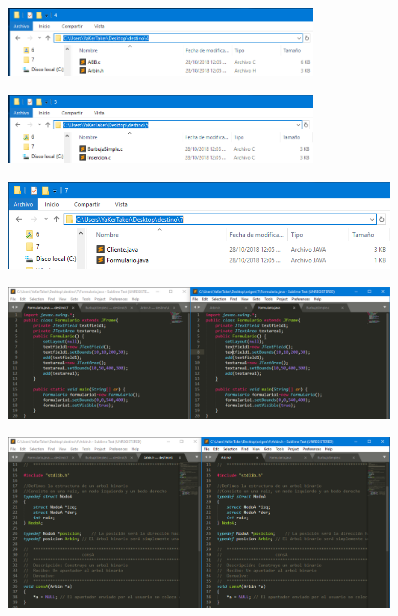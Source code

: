 \documentclass[12pt]{article}
\begin{document}
\begin{itemize}
			         \begin{figure}[h!]
			          \centering \includegraphics[width=0.72\textwidth]{Practica5/Images/windows/7_8.png}
			         \end{figure}
			         
			          \begin{figure}[h!]
			          \centering \includegraphics[width=0.72\textwidth]{Practica5/Images/windows/7_9.png}
			         \end{figure}
			         
			         \begin{figure}[h!]
			          \centering \includegraphics[width=0.9\textwidth]{Practica5/Images/windows/7_10.png}
			         \end{figure}
			         
			          \begin{figure}[h!]
			          \centering \includegraphics[width=0.9\textwidth]{Practica5/Images/windows/7_11.PNG}
			         \end{figure}
			         
			         \begin{figure}[h!]
			          \centering \includegraphics[width=0.9\textwidth]{Practica5/Images/windows/7_12.PNG}
			         \end{figure}
			         
	\end{itemize}	
	
\end{document}
